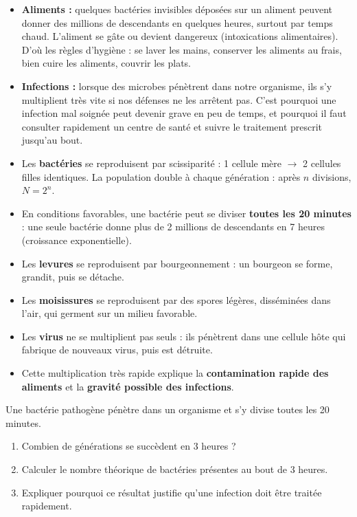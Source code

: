\documentclass[11pt]{article}
\newcommand{\cle}[1]{{\popxbold\color{popdark}#1}}
\begin{document}
\begin{itemize}
\item \textbf{Aliments :} quelques bactéries invisibles déposées sur un aliment peuvent donner des millions de descendants en quelques heures, surtout par temps chaud. L'aliment se gâte ou devient dangereux (intoxications alimentaires). D'où les règles d'hygiène : se laver les mains, conserver les aliments au frais, bien cuire les aliments, couvrir les plats.
\item \textbf{Infections :} lorsque des microbes pénètrent dans notre organisme, ils s'y multiplient très vite si nos défenses ne les arrêtent pas. C'est pourquoi une infection mal soignée peut devenir grave en peu de temps, et pourquoi il faut consulter rapidement un centre de santé et suivre le traitement prescrit jusqu'au bout.
\end{itemize}

\begin{aretenir}
\begin{itemize}
\item Les \textbf{bactéries} se reproduisent par \cle{scissiparité} : 1 cellule mère $\rightarrow$ 2 cellules filles identiques. La population double à chaque génération : après $n$ divisions, $N = 2^{n}$.
\item En conditions favorables, une bactérie peut se diviser \textbf{toutes les 20 minutes} : une seule bactérie donne plus de 2 millions de descendants en 7 heures (croissance exponentielle).
\item Les \textbf{levures} se reproduisent par \cle{bourgeonnement} : un bourgeon se forme, grandit, puis se détache.
\item Les \textbf{moisissures} se reproduisent par des \cle{spores} légères, disséminées dans l'air, qui germent sur un milieu favorable.
\item Les \textbf{virus} ne se multiplient pas seuls : ils pénètrent dans une cellule hôte qui fabrique de nouveaux virus, puis est détruite.
\item Cette multiplication très rapide explique la \textbf{contamination rapide des aliments} et la \textbf{gravité possible des infections}.
\end{itemize}
\end{aretenir}

\begin{exercice}
Une bactérie pathogène pénètre dans un organisme et s'y divise toutes les 20 minutes.
\begin{enumerate}
\item Combien de générations se succèdent en 3 heures ?
\item Calculer le nombre théorique de bactéries présentes au bout de 3 heures.
\item Expliquer pourquoi ce résultat justifie qu'une infection doit être traitée rapidement.
\end{enumerate}
\end{exercice}
\end{document}
